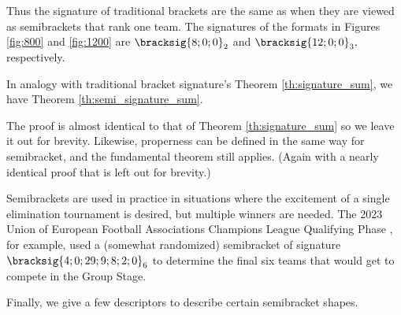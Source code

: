 {    

    Thus the signature of traditional brackets are the same as when they are viewed as semibrackets that rank one team. The signatures of the formats in Figures \ref{fig:800} and \ref{fig:1200} are $\bracksig{8;0;0}_2$ and $\bracksig{12;0;0}_3,$ respectively.

    In analogy with traditional bracket signature's Theorem \ref{th:signature_sum}, we have Theorem \ref{th:semi_signature_sum}.


    The proof is almost identical to that of Theorem \ref{th:signature_sum} so we leave it out for brevity. Likewise, properness can be defined in the same way for semibracket, and the fundamental theorem still applies. (Again with a nearly identical proof that is left out for brevity.)


    Semibrackets are used in practice in situations where the excitement of a single elimination tournament is desired, but multiple winners are needed. The 2023 Union of European Football Associations Champions League Qualifying Phase \cite{wiki_uefa}, for example, used a (somewhat randomized) semibracket of signature $\bracksig{4;0;29;9;8;2;0}_6$ to determine the final six teams that would get to compete in the Group Stage.


    Finally, we give a few descriptors to describe certain semibracket shapes.



}
